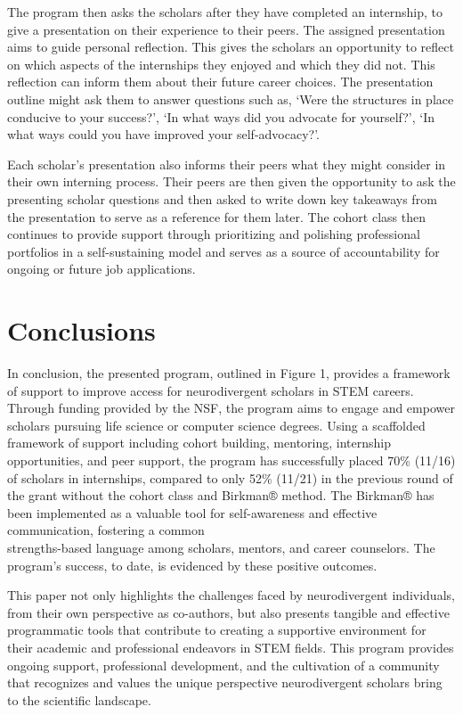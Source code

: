 \documentclass[11.5pt]{sig-alternate}
\begin{document}
\begin{large}
The program then asks the scholars after they have completed an internship, to give a presentation on their experience to their peers. The assigned presentation aims to guide personal reflection. This gives the scholars an opportunity to reflect on which aspects of the internships they enjoyed and which they did not. This reflection can inform them about their future career choices. The presentation outline might ask them to answer questions such as, `Were the structures in place conducive to your success?', `In what ways did you advocate for yourself?', `In what ways could you have improved your self-advocacy?'.

Each scholar's presentation also informs their peers what they might consider in their own interning process. Their peers are then given the opportunity to ask the presenting scholar questions and then asked to write down key takeaways from the presentation to serve as a reference for them later. The cohort class then continues to provide support through prioritizing and polishing professional portfolios in a self-sustaining model and serves as a source of accountability for ongoing or future job applications.

\section*{Conclusions}

In conclusion, the presented program, outlined in Figure 1, provides a framework of support to improve access for neurodivergent scholars in STEM careers. Through funding provided by the NSF, the program aims to engage and empower scholars pursuing life science or computer science degrees. Using a scaffolded framework of support including cohort building, mentoring, internship opportunities, and peer support, the program has successfully placed 70\% (11/16) of scholars in internships, compared to only 52\% (11/21) in the previous round of the grant without the cohort class and Birkman® method. The Birkman® has been implemented as a valuable tool for self-awareness and effective communication, fostering a common \\strengths-based language among scholars, mentors, and career counselors. The program's success, to date, is evidenced by these positive outcomes. 

This paper not only highlights the challenges faced by neurodivergent individuals, from their own perspective as co-authors, but also presents tangible and effective programmatic tools that contribute to creating a supportive environment for their academic and professional endeavors in STEM fields. This program provides ongoing support, professional development, and the cultivation of a community that recognizes and values the unique perspective neurodivergent scholars bring to the scientific landscape.


\end{large}
\end{document}
